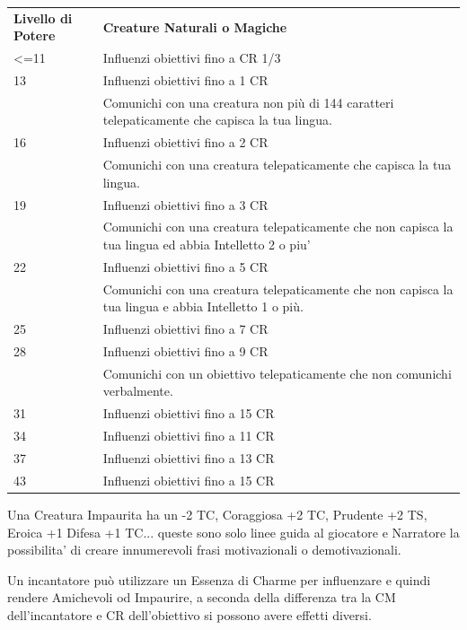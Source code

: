 \documentclass[a4paper,11pt,twoside,openany]{book}
\begin{document}
\medskip

\begin{tabularx}{0.95\textwidth}{lX}
	\toprule
	\textbf{Livello di Potere} & \textbf{Creature Naturali o Magiche}\\
	<=11  & Influenzi obiettivi fino a CR 1/3\\
	13    & Influenzi obiettivi fino a 1 CR  \\
	      & Comunichi con una creatura non più di 144 caratteri telepaticamente che capisca la tua lingua. \\
	16    & Influenzi obiettivi fino a 2  CR\\
          & Comunichi con una creatura telepaticamente che capisca la tua lingua.\\
	19    & Influenzi obiettivi fino a 3 CR  \\
          & Comunichi con una creatura telepaticamente che non capisca la tua lingua ed abbia Intelletto 2 o piu' \\
	22    & Influenzi obiettivi fino a 5 CR \\
	      & Comunichi con una creatura telepaticamente che non capisca la tua lingua e abbia Intelletto 1 o più.  \\
	25    & Influenzi obiettivi fino a 7 CR \\
	28    & Influenzi obiettivi fino a 9 CR \\
	      & Comunichi con un obiettivo telepaticamente che non comunichi verbalmente. \\
	31    & Influenzi obiettivi fino a 15 CR \\
	34    & Influenzi obiettivi fino a 11 CR \\
	37    & Influenzi obiettivi fino a 13 CR \\
	43    & Influenzi obiettivi fino a 15 CR \\
\end{tabularx}

Una Creatura Impaurita ha un -2 TC, Coraggiosa +2 TC, Prudente +2 TS, Eroica +1 Difesa +1 TC... queste sono solo linee guida al giocatore e Narratore la possibilita' di creare innumerevoli frasi motivazionali o demotivazionali.

\medskip

Un incantatore può utilizzare un Essenza di Charme per influenzare e quindi rendere Amichevoli od Impaurire, a seconda della differenza tra la CM dell'incantatore e CR dell'obiettivo si possono avere effetti diversi.

\medskip
\end{document}
